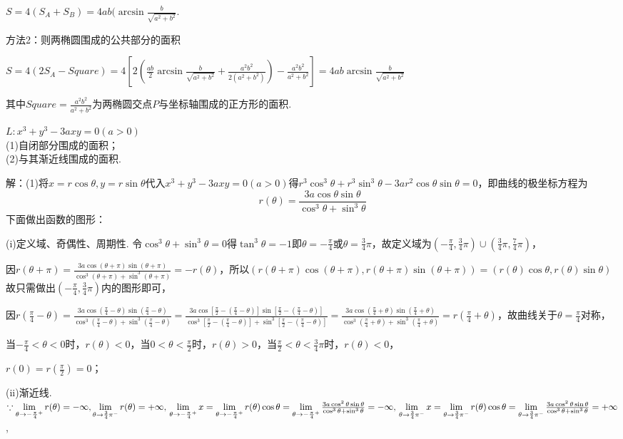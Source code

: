 \documentclass[12pt,UTF8]{ctexart}
\begin{document}
\begin{enumerate}
$S=4(S_A+S_B)=4ab(\arcsin\frac b{\sqrt{a^2+b^2}}$.

方法2：则两椭圆围成的公共部分的面积

$S=4(2S_A-Square)=4[2(\frac{ab}2\arcsin\frac b{\sqrt{a^2+b^2}}+\frac{a^2b^2}{2(a^2+b^2)})-\frac{a^2b^2}{a^2+b^2}]=4ab\arcsin\frac b{\sqrt{a^2+b^2}}$

其中$Square=\frac{a^2b^2}{a^2+b^2}$为两椭圆交点$P$与坐标轴围成的正方形的面积.

$L:x^3+y^3-3axy=0(a>0)$
\\
(1)自闭部分围成的面积；
\\
(2)与其渐近线围成的面积.

解：(1)将$x=r\cos\theta,y=r\sin\theta$代入$x^3+y^3-3axy=0(a>0)$得$r^3\cos^3\theta+r^3\sin^3\theta-3ar^2\cos\theta\sin\theta=0$，即曲线的极坐标方程为
\[r(\theta)=\frac{3a\cos\theta\sin\theta}{\cos^3\theta+\sin^3\theta}\]
下面做出函数的图形：

(i)定义域、奇偶性、周期性. 令$\cos^3\theta+\sin^3\theta=0$得$\tan^3\theta=-1$即$\theta=-\frac\pi4$或$\theta=\frac34\pi$，故定义域为$(-\frac\pi4,\frac34\pi)\cup(\frac34\pi,\frac74\pi)$，

因$r(\theta+\pi)=\frac{3a\cos(\theta+\pi)\sin(\theta+\pi)}{\cos^3(\theta+\pi)+\sin^3(\theta+\pi)}=-r(\theta)$，所以$(r(\theta+\pi)\cos(\theta+\pi),r(\theta+\pi)\sin(\theta+\pi))=(r(\theta)\cos\theta,r(\theta)\sin\theta)$故只需做出$(-\frac\pi4,\frac34\pi)$内的图形即可，

因$r(\frac\pi4-\theta)=\frac{3a\cos(\frac\pi4-\theta)\sin(\frac\pi4-\theta)}{\cos^3(\frac\pi4-\theta)+\sin^3(\frac\pi4-\theta)}=\frac{3a\cos[\frac\pi2-(\frac\pi4-\theta)]\sin[\frac\pi2-(\frac\pi4-\theta)]}{\cos^3[\frac\pi2-(\frac\pi4-\theta)]+\sin^3[\frac\pi2-(\frac\pi4-\theta)]}=\frac{3a\cos(\frac\pi4+\theta)\sin(\frac\pi4+\theta)}{\cos^3(\frac\pi4+\theta)+\sin^3(\frac\pi4+\theta)}=r(\frac\pi4+\theta)$，故曲线关于$\theta=\frac\pi4$对称，

当$-\frac\pi4<\theta<0$时，$r(\theta)<0$，当$0<\theta<\frac\pi2$时，$r(\theta)>0$，当$\frac\pi2<\theta<\frac34\pi$时，$r(\theta)<0$，

$r(0)=r(\frac\pi2)=0$；

(ii)渐近线. $\because\lim\limits_{\theta\rightarrow-\frac\pi4^+}r(\theta)=-\infty,\lim\limits_{\theta\rightarrow\frac34\pi^-}r(\theta)=+\infty,\\
\lim\limits_{\theta\rightarrow-\frac\pi4^+}x=\lim\limits_{\theta\rightarrow-\frac\pi4^+}r(\theta)\cos\theta=\lim\limits_{\theta\rightarrow-\frac\pi4^+}\frac{3a\cos^2\theta\sin\theta}{\cos^3\theta+\sin^3\theta}=-\infty,\\
\lim\limits_{\theta\rightarrow\frac34\pi^-}x=\lim\limits_{\theta\rightarrow\frac34\pi^-}r(\theta)\cos\theta=\lim\limits_{\theta\rightarrow\frac34\pi^-}\frac{3a\cos^2\theta\sin\theta}{\cos^3\theta+\sin^3\theta}=+\infty$,


\end{enumerate}
\end{document}
